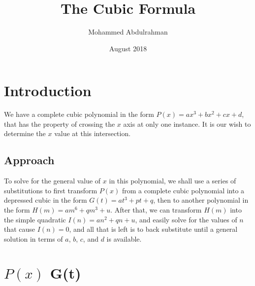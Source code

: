 \documentclass[12pt]{article}
\title{The Cubic Formula}
\author{Mohammed Abdulrahman}
\date{August 2018}
\begin{document}
\maketitle

\section{Introduction} We have a complete cubic polynomial in the form $P(x)=ax^3+bx^2+cx+d$, that has the property of crossing the $x$ axis at only one instance. It is our wish to determine the $x$ value at this intersection.

\subsection{Approach} To solve for the general value of $x$ in this polynomial, we shall use a series of substitutions to first transform $P(x)$ from a complete cubic polynomial into a depressed cubic in the form $G(t)=at^3+pt+q$, then to another polynomial in the form $H(m)=am^6+qm^3+u$. After that, we can transform $H(m)$ into the simple quadratic $I(n)=an^2+qn+u$, and easily solve for the values of $n$ that cause $I(n)=0$, and all that is left is to back substitute until a general solution in terms of $a$, $b$, $c$, and $d$ is available. 

\section{$P(x)$ \longrightarrow G(t)}
\end{document}
